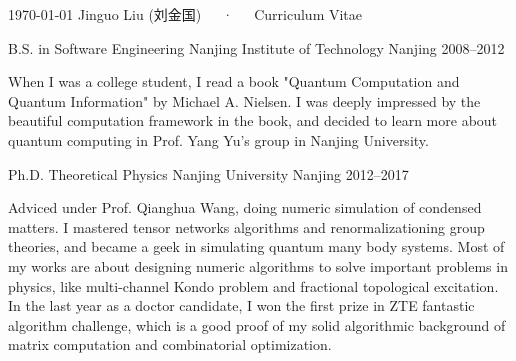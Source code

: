 \documentclass[11pt, a4paper]{awesome-cv}
\begin{document}
\makecvheader

\makecvfooter
  {\today}
  {Jinguo Liu (刘金国)~~~·~~~Curriculum Vitae}
  {\thepage}


\begin{cventries}
  \cventry
    {B.S. in Software Engineering}
    {Nanjing Institute of Technology}
    {Nanjing}
    {2008--2012}
    {\begin{cvitems}
     When I was a college student, I read a book "Quantum Computation and Quantum Information" by Michael A. Nielsen.
        I was deeply impressed by the beautiful computation framework in the book, and decided to learn more about quantum computing in Prof. Yang Yu's group in Nanjing University.
    \end{cvitems}}
  \cventry
    {Ph.D. Theoretical Physics}
    {Nanjing University}
    {Nanjing}
    {2012--2017}
    {\begin{cvitems}
    Adviced under Prof. Qianghua Wang, doing numeric simulation of condensed matters.
    I mastered tensor networks algorithms and renormalizationing group theories, and became a geek in simulating quantum many body systems. Most of my works are about designing numeric algorithms to solve important problems in physics, like multi-channel Kondo problem and fractional topological excitation.
    In the last year as a doctor candidate, I won the first prize in ZTE fantastic algorithm challenge, which is a good proof of my solid algorithmic background of matrix computation and combinatorial optimization.
    \end{cvitems}}
\end{cventries}
\end{document}

